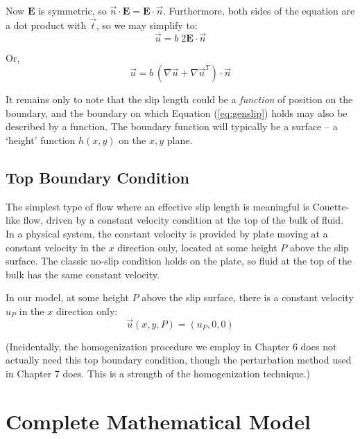 \documentclass[12pt, a4paper, twoside, openright]{book}
\begin{document}
Now $\mathbf{E}$ is symmetric, so $\vec{n} \cdot \mathbf{E} = \mathbf{E} \cdot \vec{n}$.  Furthermore, both sides of the equation are a dot product with $\vec{t}$, so we may simplify to:
\begin{equation}
\vec{u} = b \; 2 \mathbf{E} \cdot \vec{n}
\end{equation}

Or,
\begin{equation}
\vec{u} = b \, (\nabla \vec{u} + \nabla \vec{u}^T) \cdot \vec{n}
\label{eq:genslip}
\end{equation}


\vspace{1em}

It remains only to note that the slip length could be a \emph{function} of position on the boundary, and the boundary on which Equation (\ref{eq:genslip}) holds may also be described by a function. The boundary function will typically be a surface -- a `height' function $h(x,y)$ on the $x,y$ plane.


\subsection{Top Boundary Condition}

The simplest type of flow where an effective slip length is meaningful is Couette-like flow, driven by a constant velocity condition at the top of the bulk of fluid.  In a physical system, the constant velocity is provided by plate moving at a constant velocity in the $x$ direction only, located at some height $P$ above the slip surface.  The classic no-slip condition holds on the plate, so fluid at the top of the bulk has the same constant velocity.

In our model, at some height $P$ above the slip surface, there is a constant velocity $u_P$ in the $x$ direction only:
\begin{equation}
\vec{u}(x,y,P) = (u_P,0,0)
\end{equation}

(Incidentally, the homogenization procedure we employ in Chapter 6 does not actually need this top boundary condition, though the perturbation method used in Chapter 7 does.  This is a strength of the homogenization technique.)

\section{Complete Mathematical Model}
\end{document}
